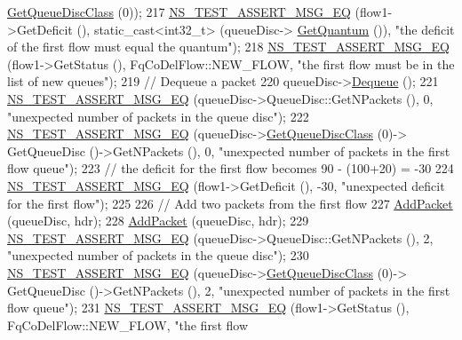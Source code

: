 \begin{DoxyCode}
      \hyperlink{classns3_1_1QueueDisc_a584d228f7bff3f754d32793a38134556}{GetQueueDiscClass} (0));
217   \hyperlink{group__testing_ga2a9d78cffb3db8e867c35fff0b698cf5}{NS\_TEST\_ASSERT\_MSG\_EQ} (flow1->GetDeficit (), \textcolor{keyword}{static\_cast<}int32\_t\textcolor{keyword}{>} (queueDisc->
      \hyperlink{classns3_1_1FqCoDelQueueDisc_aa3825612fcd4bec24bd0d52e97bd89b5}{GetQuantum} ()), \textcolor{stringliteral}{"the deficit of the first flow must equal the quantum"});
218   \hyperlink{group__testing_ga2a9d78cffb3db8e867c35fff0b698cf5}{NS\_TEST\_ASSERT\_MSG\_EQ} (flow1->GetStatus (), FqCoDelFlow::NEW\_FLOW, \textcolor{stringliteral}{"the first flow
       must be in the list of new queues"});
219   \textcolor{comment}{// Dequeue a packet}
220   queueDisc->\hyperlink{classns3_1_1QueueDisc_a6c13fc489822c1487f61c2289f2e3629}{Dequeue} ();
221   \hyperlink{group__testing_ga2a9d78cffb3db8e867c35fff0b698cf5}{NS\_TEST\_ASSERT\_MSG\_EQ} (queueDisc->QueueDisc::GetNPackets (), 0, \textcolor{stringliteral}{"unexpected number
       of packets in the queue disc"});
222   \hyperlink{group__testing_ga2a9d78cffb3db8e867c35fff0b698cf5}{NS\_TEST\_ASSERT\_MSG\_EQ} (queueDisc->\hyperlink{classns3_1_1QueueDisc_a584d228f7bff3f754d32793a38134556}{GetQueueDiscClass} (0)->
      GetQueueDisc ()->GetNPackets (), 0, \textcolor{stringliteral}{"unexpected number of packets in the first flow queue"});
223   \textcolor{comment}{// the deficit for the first flow becomes 90 - (100+20) = -30}
224   \hyperlink{group__testing_ga2a9d78cffb3db8e867c35fff0b698cf5}{NS\_TEST\_ASSERT\_MSG\_EQ} (flow1->GetDeficit (), -30, \textcolor{stringliteral}{"unexpected deficit for the first
       flow"});
225 
226   \textcolor{comment}{// Add two packets from the first flow}
227   \hyperlink{classFqCoDelQueueDiscDeficit_a366b7108078d16452276b4be0b679ac9}{AddPacket} (queueDisc, hdr);
228   \hyperlink{classFqCoDelQueueDiscDeficit_a366b7108078d16452276b4be0b679ac9}{AddPacket} (queueDisc, hdr);
229   \hyperlink{group__testing_ga2a9d78cffb3db8e867c35fff0b698cf5}{NS\_TEST\_ASSERT\_MSG\_EQ} (queueDisc->QueueDisc::GetNPackets (), 2, \textcolor{stringliteral}{"unexpected number
       of packets in the queue disc"});
230   \hyperlink{group__testing_ga2a9d78cffb3db8e867c35fff0b698cf5}{NS\_TEST\_ASSERT\_MSG\_EQ} (queueDisc->\hyperlink{classns3_1_1QueueDisc_a584d228f7bff3f754d32793a38134556}{GetQueueDiscClass} (0)->
      GetQueueDisc ()->GetNPackets (), 2, \textcolor{stringliteral}{"unexpected number of packets in the first flow queue"});
231   \hyperlink{group__testing_ga2a9d78cffb3db8e867c35fff0b698cf5}{NS\_TEST\_ASSERT\_MSG\_EQ} (flow1->GetStatus (), FqCoDelFlow::NEW\_FLOW, \textcolor{stringliteral}{"the first flow
}
\end{DoxyCode}
